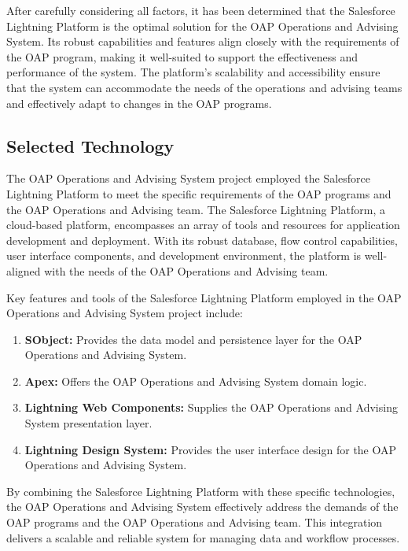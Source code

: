 \documentclass[12pt]{article}
\begin{document}
After carefully considering all factors, it has been determined that the Salesforce Lightning Platform is the optimal solution for the OAP Operations and Advising System. Its robust capabilities and features align closely with the requirements of the OAP program, making it well-suited to support the effectiveness and performance of the system. The platform's scalability and accessibility ensure that the system can accommodate the needs of the operations and advising teams and effectively adapt to changes in the OAP programs.

\subsection{Selected Technology} 
The OAP Operations and Advising System project employed the Salesforce Lightning Platform to meet the specific requirements of the OAP programs and the OAP Operations and Advising team. The Salesforce Lightning Platform, a cloud-based platform, encompasses an array of tools and resources for application development and deployment. With its robust database, flow control capabilities, user interface components, and development environment, the platform is well-aligned with the needs of the OAP Operations and Advising team.

Key features and tools of the Salesforce Lightning Platform employed in the OAP Operations and Advising System project include: 

\begin{enumerate}[label=(\roman*)] 
    \item \textbf{SObject:} Provides the data model and persistence layer for the OAP Operations and Advising System. 
    \item \textbf{Apex:} Offers the OAP Operations and Advising System domain logic. 
    \item \textbf{Lightning Web Components:} Supplies the OAP Operations and Advising System presentation layer. 
    \item \textbf{Lightning Design System:} Provides the user interface design for the OAP Operations and Advising System. 
\end{enumerate}

By combining the Salesforce Lightning Platform with these specific technologies, the OAP Operations and Advising System effectively address the demands of the OAP programs and the OAP Operations and Advising team. This integration delivers a scalable and reliable system for managing data and workflow processes.
\end{document}
